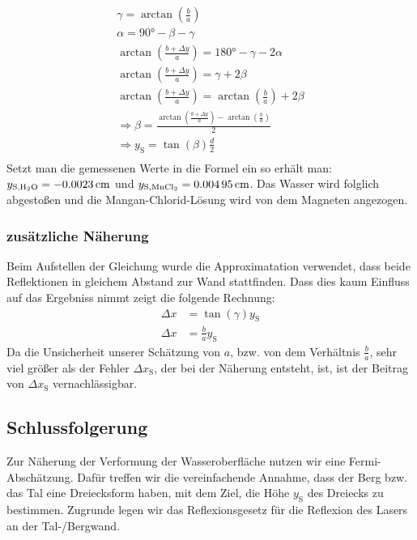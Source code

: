 \documentclass[
	a4paper,
	12pt,
	pagesize,
	ngerman
]{scrartcl}
\begin{document}
	\begin{gather*}
		\gamma = \arctan \left(\frac{b}{a}\right) \\
		\alpha = \ang{90} - \beta - \gamma \\
		\arctan \left(\frac{b+\Delta y}{a}\right) = \ang{180} - \gamma - 2\alpha \\
		\arctan \left(\frac{b+\Delta y}{a}\right) = \gamma + 2 \beta \\
		\arctan \left(\frac{b+\Delta y}{a}\right) =   \arctan \left(\frac{b}{a}\right) + 2 \beta \\
		\Rightarrow \beta = \frac{\arctan \left(\frac{b+\Delta y}{a}\right) -  \arctan \left(\frac{b}{a}\right)}{2} \\
		\Rightarrow y_\text{S} = \tan (\beta) \frac{d}{2}  \\
	\end{gather*}
	Setzt man die gemessenen Werte in die Formel ein so erhält man: $ y_{\text{S,\ce{H2O}}} = \SI{-0,0023}{ cm} $ und $y_{\text{S,\ce{MnCl2}}} = \SI{0,00495}{ cm} $. Das Wasser wird folglich abgestoßen und die Mangan-Chlorid-Lösung wird von dem Magneten angezogen.
	\subsubsection*{zusätzliche Näherung}
	Beim Aufstellen der Gleichung wurde die Approximatation verwendet, dass beide Reflektionen in gleichem Abstand zur Wand stattfinden. Dass dies kaum Einfluss auf das Ergebniss nimmt zeigt die folgende Rechnung:
	\begin{align*}
		\Delta x &= \tan (\gamma) y_\text{S} \\
		\Delta x &= \frac{b}{a} y_\text{S}
	\end{align*}
	Da die Unsicherheit unserer Schätzung von $a$, bzw. von dem Verhältnis $\frac{b}{a}$, sehr viel größer als der Fehler $\Delta x_\text{S}$, der bei der Näherung entsteht, ist, ist der Beitrag von $\Delta x_\text{S}$ vernachlässigbar.



	\subsection{Schlussfolgerung}
	Zur Näherung der Verformung der Wasseroberfläche nutzen wir eine Fermi-Abschätzung. Dafür treffen wir die vereinfachende Annahme, dass der Berg bzw. das Tal eine Dreiecksform haben, mit dem Ziel, die Höhe $y_\text{S}$ des Dreiecks zu bestimmen. Zugrunde legen wir das Reflexionsgesetz für die Reflexion des Lasers an der Tal-/Bergwand.
	
\end{document}
